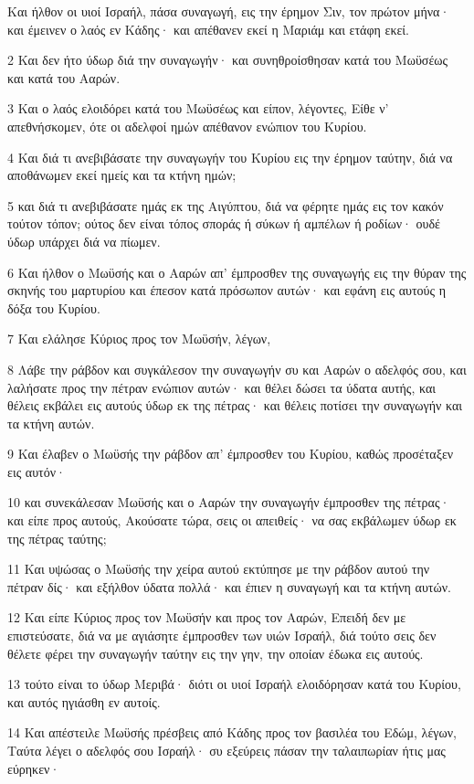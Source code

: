 \par Και ήλθον οι υιοί Ισραήλ, πάσα συναγωγή, εις την έρημον Σιν, τον πρώτον μήνα· και έμεινεν ο λαός εν Κάδης· και απέθανεν εκεί η Μαριάμ και ετάφη εκεί.
\par 2 Και δεν ήτο ύδωρ διά την συναγωγήν· και συνηθροίσθησαν κατά του Μωϋσέως και κατά του Ααρών.
\par 3 Και ο λαός ελοιδόρει κατά του Μωϋσέως και είπον, λέγοντες, Είθε ν' απεθνήσκομεν, ότε οι αδελφοί ημών απέθανον ενώπιον του Κυρίου.
\par 4 Και διά τι ανεβιβάσατε την συναγωγήν του Κυρίου εις την έρημον ταύτην, διά να αποθάνωμεν εκεί ημείς και τα κτήνη ημών;
\par 5 και διά τι ανεβιβάσατε ημάς εκ της Αιγύπτου, διά να φέρητε ημάς εις τον κακόν τούτον τόπον; ούτος δεν είναι τόπος σποράς ή σύκων ή αμπέλων ή ροδίων· ουδέ ύδωρ υπάρχει διά να πίωμεν.
\par 6 Και ήλθον ο Μωϋσής και ο Ααρών απ' έμπροσθεν της συναγωγής εις την θύραν της σκηνής του μαρτυρίου και έπεσον κατά πρόσωπον αυτών· και εφάνη εις αυτούς η δόξα του Κυρίου.
\par 7 Και ελάλησε Κύριος προς τον Μωϋσήν, λέγων,
\par 8 Λάβε την ράβδον και συγκάλεσον την συναγωγήν συ και Ααρών ο αδελφός σου, και λαλήσατε προς την πέτραν ενώπιον αυτών· και θέλει δώσει τα ύδατα αυτής, και θέλεις εκβάλει εις αυτούς ύδωρ εκ της πέτρας· και θέλεις ποτίσει την συναγωγήν και τα κτήνη αυτών.
\par 9 Και έλαβεν ο Μωϋσής την ράβδον απ' έμπροσθεν του Κυρίου, καθώς προσέταξεν εις αυτόν·
\par 10 και συνεκάλεσαν Μωϋσής και ο Ααρών την συναγωγήν έμπροσθεν της πέτρας· και είπε προς αυτούς, Ακούσατε τώρα, σεις οι απειθείς· να σας εκβάλωμεν ύδωρ εκ της πέτρας ταύτης;
\par 11 Και υψώσας ο Μωϋσής την χείρα αυτού εκτύπησε με την ράβδον αυτού την πέτραν δίς· και εξήλθον ύδατα πολλά· και έπιεν η συναγωγή και τα κτήνη αυτών.
\par 12 Και είπε Κύριος προς τον Μωϋσήν και προς τον Ααρών, Επειδή δεν με επιστεύσατε, διά να με αγιάσητε έμπροσθεν των υιών Ισραήλ, διά τούτο σεις δεν θέλετε φέρει την συναγωγήν ταύτην εις την γην, την οποίαν έδωκα εις αυτούς.
\par 13 τούτο είναι το ύδωρ Μεριβά· διότι οι υιοί Ισραήλ ελοιδόρησαν κατά του Κυρίου, και αυτός ηγιάσθη εν αυτοίς.
\par 14 Και απέστειλε Μωϋσής πρέσβεις από Κάδης προς τον βασιλέα του Εδώμ, λέγων, Ταύτα λέγει ο αδελφός σου Ισραήλ· συ εξεύρεις πάσαν την ταλαιπωρίαν ήτις μας εύρηκεν·
